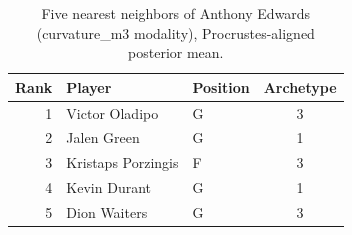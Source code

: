 \begin{table}[htbp]
  \centering\small
  \begin{tabular}{rllc}
    \toprule
    Rank & Player & Position & Archetype \\
    \midrule
    1 & Victor Oladipo & G & 3 \\
    2 & Jalen Green & G & 1 \\
    3 & Kristaps Porzingis & F & 3 \\
    4 & Kevin Durant & G & 1 \\
    5 & Dion Waiters & G & 3 \\
    \bottomrule
  \end{tabular}
  \caption{Five nearest neighbors of Anthony Edwards (curvature_m3 modality), Procrustes-aligned posterior mean.}
  \label{tab:Anthony_Edwards_neighbors_curvature_m3}
\end{table}

